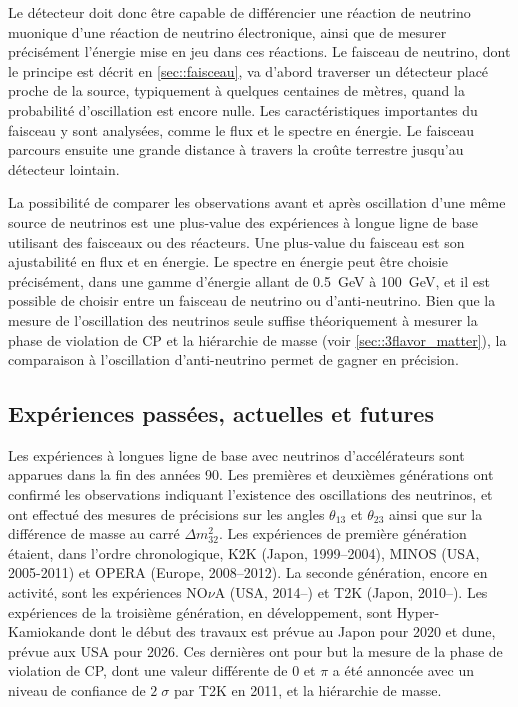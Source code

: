             Le détecteur doit donc être capable de différencier une réaction de neutrino muonique d'une réaction de neutrino électronique, ainsi que de mesurer précisément l'énergie mise en jeu dans ces réactions. Le faisceau de neutrino, dont le principe est décrit en \autoref{sec::faisceau}, va d'abord traverser un détecteur placé proche de la source, typiquement à quelques centaines de mètres, quand la probabilité d'oscillation est encore nulle. Les caractéristiques importantes du faisceau y sont analysées, comme le flux et le spectre en énergie. Le faisceau parcours ensuite une grande distance à travers la croûte terrestre jusqu'au détecteur lointain. 
            
            La possibilité de comparer les observations avant et après oscillation d'une même source de neutrinos est une plus-value des expériences à longue ligne de base utilisant des faisceaux ou des réacteurs. Une plus-value du faisceau est son ajustabilité en flux et en énergie. Le spectre en énergie peut être choisie précisément, dans une gamme d'énergie allant de \SI{0.5}{\giga\electronvolt} à \SI{100}{\giga\electronvolt}, et il est possible de choisir entre un faisceau de neutrino ou d'anti-neutrino. Bien que la mesure de l'oscillation des neutrinos seule suffise théoriquement à mesurer la phase de violation de CP et la hiérarchie de masse (voir \autoref{sec::3flavor_matter}), la comparaison à l'oscillation d'anti-neutrino permet de gagner en précision.    
                    
        \subsection{Expériences passées, actuelles et futures}
        
            Les expériences à longues ligne de base avec neutrinos d'accélérateurs sont apparues dans la fin des années 90. Les premières et deuxièmes générations ont confirmé les observations indiquant l'existence des oscillations des neutrinos, et ont effectué des mesures de précisions sur les angles $\theta_{13}$ et $\theta_{23}$ ainsi que sur la différence de masse au carré $\Delta m^2_{32}$\cite{pdg2018}. Les expériences de première génération étaient, dans l'ordre chronologique, K2K\cite{Collaboration2006a} (Japon, 1999--2004), MINOS\cite{Collaboration2014} (USA, 2005-2011) et OPERA\cite{Agafonova2018} (Europe, 2008--2012). La seconde génération, encore en activité, sont les expériences NO$\nu$A\cite{Adamson2016} (USA, 2014--) et T2K\cite{Abe2018} (Japon, 2010--). Les expériences de la troisième génération, en développement, sont Hyper-Kamiokande\cite{HK2018} dont le début des travaux est prévue au Japon pour  2020 et \gls{dune}\cite{Acciarri2016}, prévue aux USA pour 2026. Ces dernières ont pour but la mesure de la phase de violation de CP, dont une valeur différente de $0$ et $\pi$ a été annoncée avec un niveau de confiance de $2\;\sigma$\cite{t2k-cp} par T2K en 2011, et la hiérarchie de masse.
            
